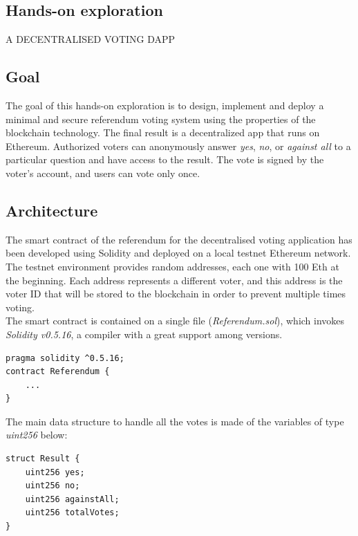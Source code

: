 \documentclass[10pt]{article}
\begin{document}
\begin{multicols}{2}
\section{Hands-on exploration}

\begin{center}
\uppercase{A decentralised voting DApp}
\end{center}

\subsection{Goal}

The goal of this hands-on exploration is to design, implement and deploy a minimal and secure referendum voting system using the properties of the blockchain technology. The final result is a decentralized app that runs on Ethereum. Authorized voters can anonymously answer \textit{yes}, \textit{no}, or \textit{against all} to a particular question and have access to the result. The vote is signed by the voter's account, and users can vote only once.

\subsection{Architecture}

The smart contract of the referendum for the decentralised voting application has been developed using Solidity and deployed on a local testnet Ethereum network.\\

The testnet environment provides random addresses, each one with 100 Eth at the beginning. Each address represents a different voter, and this address is the voter ID that will be stored to the blockchain in order to prevent multiple times voting.\\

The smart contract is contained on a single file (\textit{Referendum.sol}), which invokes \textit{Solidity v0.5.16}, a compiler with a great support among versions.\\

\begin{lstlisting}[language=Solidity]
pragma solidity ^0.5.16;
contract Referendum {
	...
}
\end{lstlisting}

The main data structure to handle all the votes is made of the variables of type \textit{uint256} below:

\begin{lstlisting}[language=Solidity]
struct Result {
	uint256 yes;
	uint256 no;
	uint256 againstAll;
	uint256 totalVotes;
}
\end{lstlisting}


\end{multicols}
\end{document}
